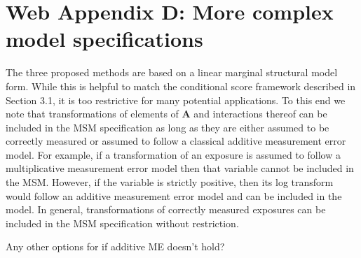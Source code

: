 \documentclass[12pt]{article}
\begin{document}
\section{Web Appendix D: More complex model specifications}

The three proposed methods are based on a linear marginal structural model form. While this is helpful to match the conditional score framework described in Section 3.1, it is too restrictive for many potential applications. To this end we note that transformations of elements of $\bm{A}$ and interactions thereof can be included in the MSM specification as long as they are either assumed to be correctly measured or assumed to follow a classical additive measurement error model. For example, if a transformation of an exposure is assumed to follow a multiplicative measurement error model then that variable cannot be included in the MSM. However, if the variable is strictly positive, then its log transform would follow an additive measurement error model and can be included in the model. In general, transformations of correctly measured exposures can be included in the MSM specification without restriction.

Any other options for if additive ME doesn't hold?



\end{document}
